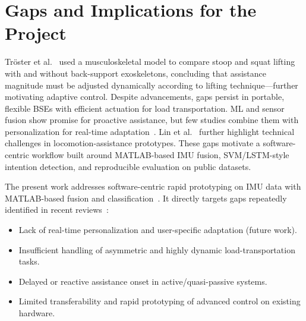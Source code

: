 \section{Gaps and Implications for the Project}
Tr\"oster et al.~\cite{troster2022} used a musculoskeletal model to compare stoop and squat lifting with and without back-support exoskeletons, concluding that assistance magnitude must be adjusted dynamically according to lifting technique---further motivating adaptive control. Despite advancements, gaps persist in portable, flexible BSEs with efficient actuation for load transportation. ML and sensor fusion show promise for proactive assistance, but few studies combine them with personalization for real-time adaptation~\cite{lin2025}. Lin et al.~\cite{lin2025} further highlight technical challenges in locomotion-assistance prototypes. These gaps motivate a software-centric workflow built around MATLAB-based IMU fusion, SVM/LSTM-style intention detection, and reproducible evaluation on public datasets.

The present work addresses software-centric rapid prototyping on IMU data with MATLAB-based fusion and classification~\cite{zhang2012,chereshnev2018}. It directly targets gaps repeatedly identified in recent reviews~\cite{pesenti2021,kermavnar2021,troster2022,lin2025}:
\begin{itemize}
  \setlength{\itemsep}{4pt plus 1pt minus 1pt}
  \setlength{\parsep}{0pt}
  \item Lack of real-time personalization and user-specific adaptation (future work).
  \item Insufficient handling of asymmetric and highly dynamic load-transportation tasks.
  \item Delayed or reactive assistance onset in active/quasi-passive systems.
  \item Limited transferability and rapid prototyping of advanced control on existing hardware.
\end{itemize}

